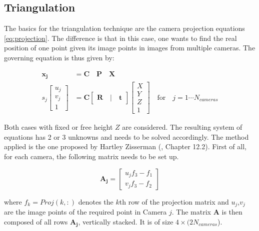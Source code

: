 \subsection{Triangulation}
\label{sec:triangulation}

The basics for the triangulation technique are the camera projection equations \eqref{eq:projection}.
The difference is that in this case, one wants to find the real position of one point given its image points in images from multiple cameras. The governing equation is thus given by:

\begin{align}
    \mathbf{x_j} & = \mathbf{C} \quad \mathbf{P} \quad     \mathbf{X} \\
    s_j \begin{bmatrix} u_j \\ v_j \\ 1 \end{bmatrix} &= 
    \mathbf{C} \begin{bmatrix} \mathbf{R} \quad|\quad \mathbf{t} \end{bmatrix}
    \begin{bmatrix} X \\ Y \\  Z \\ 1 \end{bmatrix} \quad \text{for} \quad j=1\cdots N_{cameras} 
    \label{eq:triangulation}
 \end{align}

Both cases with fixed or free height $Z$ are considered. The resulting system of equations has 2 or 3 unknowns and needs to be solved accordingly. 
The method applied is the one proposed by Hartley Zisserman (\cite{hz}, Chapter 12.2). First of all, for each camera, the following matrix needs to be set up.

\begin{equation}
    \mathbf{A_j} = \begin{bmatrix} u_j f_3-f_1 \\ v_j f_3-f_2 \end{bmatrix}
\end{equation}

where $f_k=Proj(k,:)$ denotes the $k$th row of the projection matrix and $u_j$,$v_j$ are the image points of the required point in Camera $j$.
The matrix $\mathbf{A}$ is then composed of all rows $\mathbf{A_j}$, vertically stacked. It is of size $4\times(2 N_{cameras}$).


